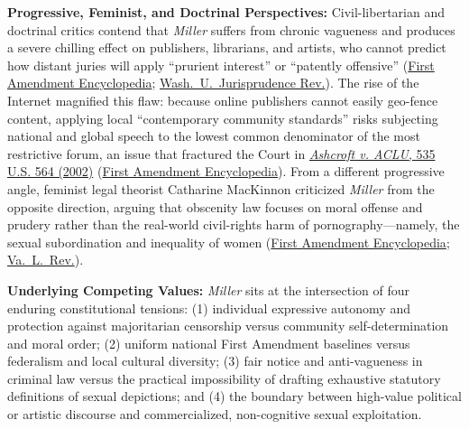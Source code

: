 \documentclass[12pt]{article}
\begin{document}
\textbf{Progressive, Feminist, and Doctrinal Perspectives:} Civil-libertarian and doctrinal critics contend that \textit{Miller} suffers from chronic vagueness and produces a severe chilling effect on publishers, librarians, and artists, who cannot predict how distant juries will apply ``prurient interest'' or ``patently offensive'' (\href{https://firstamendment.mtsu.edu/article/miller-v-california/}{First Amendment Encyclopedia}; \href{https://journals.library.wustl.edu/jurisprudence/article/8891/galley/25674/view/}{Wash.\ U.\ Jurisprudence Rev.}). The rise of the Internet magnified this flaw: because online publishers cannot easily geo-fence content, applying local ``contemporary community standards'' risks subjecting national and global speech to the lowest common denominator of the most restrictive forum, an issue that fractured the Court in \href{https://supreme.justia.com/cases/federal/us/535/564/}{\textit{Ashcroft v. ACLU}, 535 U.S. 564 (2002)} (\href{https://firstamendment.mtsu.edu/article/community-standards/}{First Amendment Encyclopedia}). From a different progressive angle, feminist legal theorist Catharine MacKinnon criticized \textit{Miller} from the opposite direction, arguing that obscenity law focuses on moral offense and prudery rather than the real-world civil-rights harm of pornography---namely, the sexual subordination and inequality of women (\href{https://firstamendment.mtsu.edu/article/catharine-mackinnon/}{First Amendment Encyclopedia}; \href{https://virginialawreview.org/wp-content/uploads/2020/12/MacKinnon_Book.pdf}{Va.\ L.\ Rev.}).

\textbf{Underlying Competing Values:} \textit{Miller} sits at the intersection of four enduring constitutional tensions: (1) individual expressive autonomy and protection against majoritarian censorship versus community self-determination and moral order; (2) uniform national First Amendment baselines versus federalism and local cultural diversity; (3) fair notice and anti-vagueness in criminal law versus the practical impossibility of drafting exhaustive statutory definitions of sexual depictions; and (4) the boundary between high-value political or artistic discourse and commercialized, non-cognitive sexual exploitation.
\end{document}

